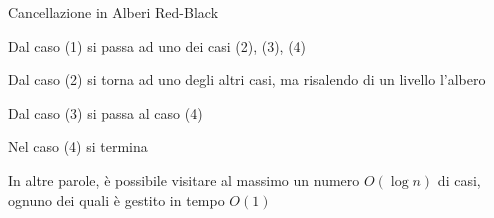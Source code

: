 \begin{frame}{Cancellazione in Alberi Red-Black}

\BIL
\item Dal caso (1) si passa ad uno dei casi (2), (3), (4)
\item Dal caso (2) si torna ad uno degli altri casi, ma \alert{risalendo di un livello l'albero}
\item Dal caso (3) si passa al caso (4)
\item Nel caso (4) si termina
\EIL

\BIL
\item In altre parole, è possibile visitare al massimo un numero $O(\log n)$ di 
casi, ognuno dei quali è gestito in tempo $O(1)$
\EIL

\end{frame}




